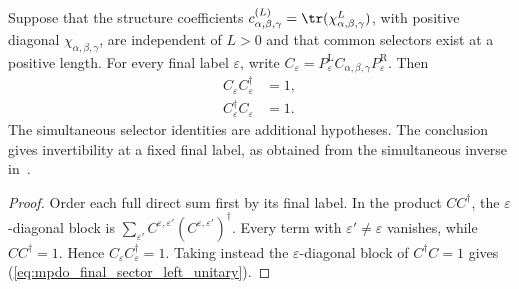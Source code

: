 \begin{lemma}%
    \label{thm:mpdo_triple_fusion_comparison_final_sector_unitary}
    \leanok
    Suppose that the structure coefficients
    $c_{\alpha,\beta,\gamma}^{(L)}
        =\tr(\chi_{\alpha,\beta,\gamma}^{L})$,
    with positive diagonal $\chi_{\alpha,\beta,\gamma}$, are independent of
    $L>0$ and that common selectors exist at a positive length.
    For every final label $\varepsilon$, write
    $C_\varepsilon
        =P^{\mathrm L}_{\varepsilon}
        C_{\alpha,\beta,\gamma}
        P^{\mathrm R}_{\varepsilon}$. Then
    \begin{align}
        C_\varepsilon C_\varepsilon^\dagger
         & =1,
        \label{eq:mpdo_final_sector_right_unitary} \\
        C_\varepsilon^\dagger C_\varepsilon
         & =1.
        \label{eq:mpdo_final_sector_left_unitary}
    \end{align}
    The simultaneous selector identities are additional hypotheses.
    The conclusion gives invertibility at a fixed final label, as obtained
    from the simultaneous inverse in~\cite[lines~247--277]{Bultinck2017Anyons}.
\end{lemma}
\begin{proof}\leanok
    Order each full direct sum first by its final label. In the product
    $CC^\dagger$, the $\varepsilon$-diagonal block is
    $\sum_{\varepsilon'}
        C^{\varepsilon,\varepsilon'}
        (C^{\varepsilon,\varepsilon'})^\dagger$.
    Every term with $\varepsilon'\ne\varepsilon$ vanishes, while
    $CC^\dagger=1$. Hence
    $C_\varepsilon C_\varepsilon^\dagger=1$. Taking instead the
    $\varepsilon$-diagonal block of $C^\dagger C=1$ gives
    (\ref{eq:mpdo_final_sector_left_unitary}).
\end{proof}

